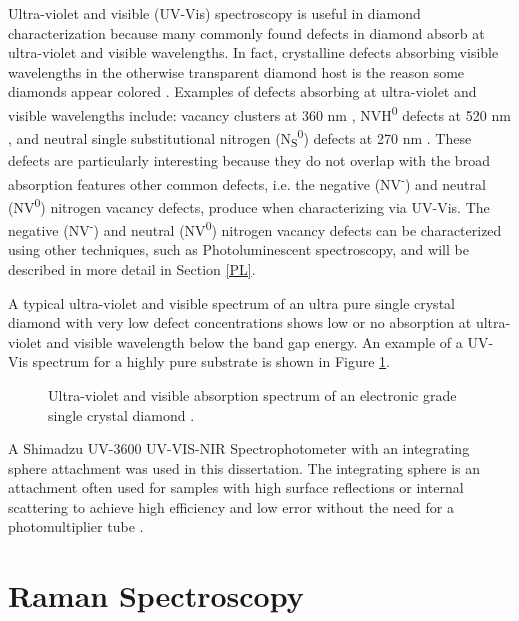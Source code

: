Ultra-violet and visible (UV-Vis) spectroscopy is useful in diamond characterization because many commonly found defects in diamond absorb at ultra-violet and visible wavelengths. In fact, crystalline defects absorbing visible wavelengths in the otherwise transparent diamond host is the reason some diamonds appear colored \cite{Collins2003TheSpectroscopy,Fisher2009BrownDefects, Gaillou2010SpectroscopicDiamonds} . Examples of defects absorbing at ultra-violet and visible wavelengths include: vacancy clusters at 360 nm \cite{Jones2009DislocationsDiamond},  NVH\textsuperscript{0} defects at 520 nm \cite{Khan2013Colour-causingDiamond}, and neutral single substitutional nitrogen (N\textsubscript{S}\textsuperscript{0}) defects at 270 nm \cite{Chrenko1971DispersedDiamonds}. These defects are particularly interesting because they do not overlap with the broad absorption features  other common defects, i.e. the negative (NV\textsuperscript{-}) and neutral (NV\textsuperscript{0}) nitrogen vacancy defects, produce when characterizing via UV-Vis. The negative (NV\textsuperscript{-}) and neutral (NV\textsuperscript{0}) nitrogen vacancy defects can be characterized using other techniques, such as Photoluminescent spectroscopy, and will be described in more detail in Section \ref{PL}.

A typical ultra-violet and visible spectrum of an ultra pure single crystal diamond with very low defect concentrations shows low or no absorption at ultra-violet and visible wavelength below the band gap energy.  An example of a UV-Vis spectrum for a highly pure substrate is shown in Figure \ref{fig:ELSCDUVVis}.

\begin{figure}
    \centering
    
    \caption{Ultra-violet and visible absorption spectrum of an electronic grade single crystal diamond \cite{Luo2021}.}
    \label{fig:ELSCDUVVis}
\end{figure}

A Shimadzu UV-3600 UV-VIS-NIR Spectrophotometer with an integrating sphere attachment was used in this dissertation. The integrating sphere is an attachment often used for samples with high surface reflections or internal scattering to achieve high efficiency and low error without the need for a photomultiplier tube \cite{Castiglioni2000AnSamples,Jacquez1955TheorySphere}. 

\section{Raman Spectroscopy}
\label{Raman}
\indent

